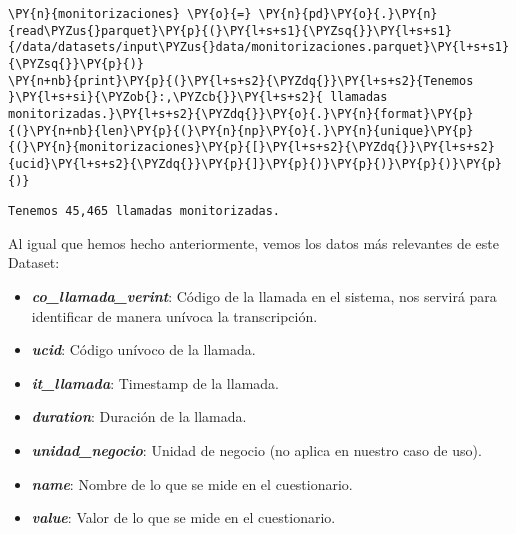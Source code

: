     \begin{tcolorbox}[breakable, size=fbox, boxrule=1pt, pad at break*=1mm,colback=cellbackground, colframe=cellborder]
\begin{Verbatim}[commandchars=\\\{\}]
\PY{n}{monitorizaciones} \PY{o}{=} \PY{n}{pd}\PY{o}{.}\PY{n}{read\PYZus{}parquet}\PY{p}{(}\PY{l+s+s1}{\PYZsq{}}\PY{l+s+s1}{/data/datasets/input\PYZus{}data/monitorizaciones.parquet}\PY{l+s+s1}{\PYZsq{}}\PY{p}{)}
\PY{n+nb}{print}\PY{p}{(}\PY{l+s+s2}{\PYZdq{}}\PY{l+s+s2}{Tenemos }\PY{l+s+si}{\PYZob{}:,\PYZcb{}}\PY{l+s+s2}{ llamadas monitorizadas.}\PY{l+s+s2}{\PYZdq{}}\PY{o}{.}\PY{n}{format}\PY{p}{(}\PY{n+nb}{len}\PY{p}{(}\PY{n}{np}\PY{o}{.}\PY{n}{unique}\PY{p}{(}\PY{n}{monitorizaciones}\PY{p}{[}\PY{l+s+s2}{\PYZdq{}}\PY{l+s+s2}{ucid}\PY{l+s+s2}{\PYZdq{}}\PY{p}{]}\PY{p}{)}\PY{p}{)}\PY{p}{)}\PY{p}{)}
\end{Verbatim}
\end{tcolorbox}

    \begin{Verbatim}[commandchars=\\\{\}]
Tenemos 45,465 llamadas monitorizadas.
    \end{Verbatim}

        
    Al igual que hemos hecho anteriormente, vemos los datos más relevantes
de este Dataset:

\begin{itemize}
 


\item \textbf{\textit{co\_llamada\_verint}}: Código de la llamada en el sistema, nos servirá
para identificar de manera unívoca la transcripción.

\item \textbf{\textit{ucid}}: Código unívoco de la llamada.

\item \textbf{\textit{it\_llamada}}: Timestamp de la llamada.

\item \textbf{\textit{duration}}: Duración de la llamada.

\item \textbf{\textit{unidad\_negocio}}: Unidad de negocio (no aplica en nuestro caso de uso).

\item \textbf{\textit{name}}: Nombre de lo que se mide en el cuestionario.

\item \textbf{\textit{value}}: Valor de lo que se mide en el cuestionario.

\end{itemize}


